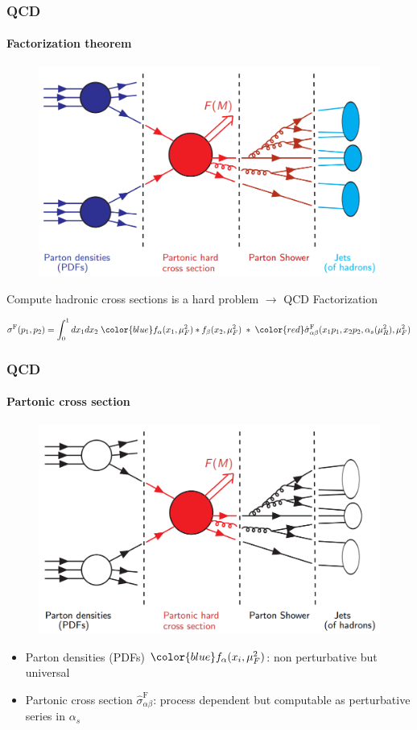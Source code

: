 \documentclass[aspectratio=43]{beamer}
\begin{document}
\begin{frame}

	\frametitle{QCD}
	\framesubtitle{Factorization theorem}

	\vspace{0.4 cm}
	
	\begin{figure}
		\includegraphics[width = 7 cm]{plots/factorization_1.png}
	\end{figure}
	
	Compute hadronic cross sections is a {\color{red}hard problem} $\longrightarrow$ {\color{blue} QCD Factorization}
	
	\begin{equation}
		\sigma^{\textrm{F}}(p_{1}, p_{2}) =
		\int_{0}^{1} dx_{1} dx_{2} \; {\color{blue} f_{\alpha}(x_{1}, \mu_{F}^{2}) \ast f_{\beta}(x_{2}, \mu_{F}^{2})}
		\; \ast \;  
		{\color{red}\hat{\sigma}^{\textrm{F}}_{\alpha \beta}(x_{1}p_{1}, x_{2}p_{2}, \alpha_{s}(\mu_{R}^{2}), \mu_{F}^{2})} \nonumber
	\end{equation}

\end{frame}

\begin{frame}
	
	\frametitle{QCD}
	\framesubtitle{Partonic cross section}
	
	\begin{figure}
		\includegraphics[width = 7 cm]{plots/factorization_2.png}
	\end{figure}
	
	\begin{itemize}
		\item Parton densities (PDFs) ${\color{blue} f_{\alpha}(x_{i}, \mu_{F}^{2})}$: non perturbative but universal
		\item Partonic cross section {\color{red}$\hat{\sigma}^{\textrm{F}}_{\alpha \beta}$}: process dependent but computable as perturbative series in $\alpha_{s}$
	\end{itemize}
	
\end{frame}
\end{document}
